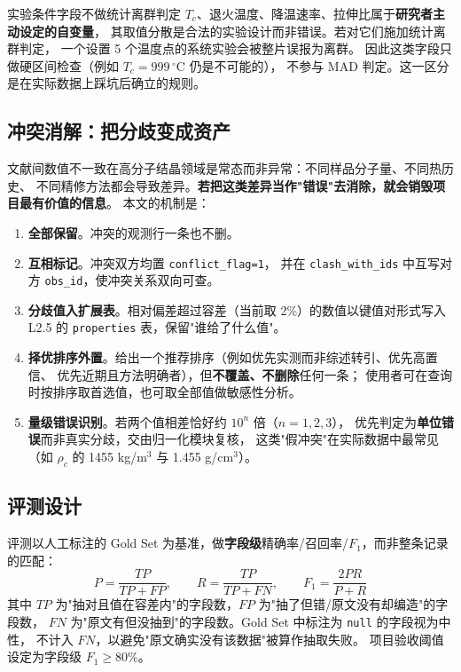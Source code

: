 \documentclass[11pt,a4paper]{ctexart}
\begin{document}
\begin{tipbox}{实验条件字段不做统计离群判定}
$T_c$、退火温度、降温速率、拉伸比属于\textbf{研究者主动设定的自变量}，
其取值分散是合法的实验设计而非错误。若对它们施加统计离群判定，
一个设置 5 个温度点的系统实验会被整片误报为离群。
因此这类字段只做硬区间检查（例如 $T_c = 999\,^\circ$C 仍是不可能的），
不参与 MAD 判定。这一区分是在实际数据上踩坑后确立的规则。
\end{tipbox}

\subsection{冲突消解：把分歧变成资产}\label{sec:conflict}

文献间数值不一致在高分子结晶领域是常态而非异常：不同样品分子量、不同热历史、
不同精修方法都会导致差异。\textbf{若把这类差异当作"错误"去消除，就会销毁项目最有价值的信息}。
本文的机制是：

\begin{enumerate}[label=(\arabic*), leftmargin=2.2em]
  \item \textbf{全部保留}。冲突的观测行一条也不删。
  \item \textbf{互相标记}。冲突双方均置 \texttt{conflict\_flag=1}，
        并在 \texttt{clash\_with\_ids} 中互写对方 \texttt{obs\_id}，使冲突关系双向可查。
  \item \textbf{分歧值入扩展表}。相对偏差超过容差（当前取 2\%）的数值以键值对形式写入
        L2.5 的 \texttt{properties} 表，保留"谁给了什么值"。
  \item \textbf{择优排序外置}。给出一个推荐排序（例如优先实测而非综述转引、优先高置信、
        优先近期且方法明确者），但\textbf{不覆盖、不删除}任何一条；
        使用者可在查询时按排序取首选值，也可取全部值做敏感性分析。
  \item \textbf{量级错误识别}。若两个值相差恰好约 $10^n$ 倍（$n=1,2,3$），
        优先判定为\textbf{单位错误}而非真实分歧，交由归一化模块复核，
        这类"假冲突"在实际数据中最常见（如 $\rho_c$ 的 1455 kg/m$^3$ 与 1.455 g/cm$^3$）。
\end{enumerate}

\subsection{评测设计}

评测以人工标注的 Gold Set 为基准，做\textbf{字段级}精确率/召回率/$F_1$，而非整条记录的匹配：
\begin{equation}
P = \frac{TP}{TP+FP},\qquad R = \frac{TP}{TP+FN},\qquad F_1 = \frac{2PR}{P+R}
\end{equation}
其中 $TP$ 为"抽对且值在容差内"的字段数，$FP$ 为"抽了但错/原文没有却编造"的字段数，
$FN$ 为"原文有但没抽到"的字段数。Gold Set 中标注为 \texttt{null} 的字段视为中性，
不计入 $FN$，以避免"原文确实没有该数据"被算作抽取失败。
项目验收阈值设定为字段级 $F_1 \geq 80\%$。
\end{document}
